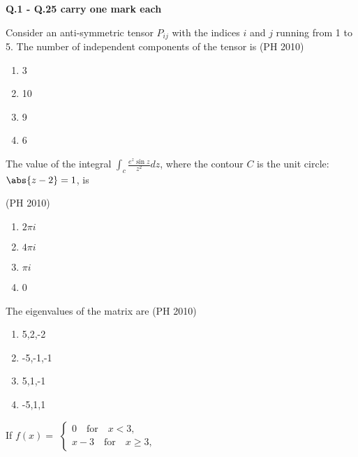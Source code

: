 \iffalse
\title{PH-2010-1-13}
\author{EE24BTECH11041-Mohit}
\section{PH}
\chapter{2010}
\fi


\textbf{Q.1 - Q.25 carry one mark each}

\item Consider an anti-symmetric tensor $P_{ij}$ with the indices $i$ and $j$ running from 1 to 5. The number of independent components of the tensor is 
\hfill{(PH 2010)}
\begin{multicols}{4}
\begin{enumerate}
\item 3
\item 10
\item 9 
\item 6
\end{enumerate}
\end{multicols}
\item The value of the integral $\int_{c} \frac {e^z \sin{z}}{z^2}dz$, where the contour $C$ is the unit circle:
$\abs{z-2}=1$, is

\hfill{(PH 2010)}
\begin{multicols}{4}
\begin{enumerate}
\item $2\pi i$
\item $4\pi i$
\item $\pi i$
\item 0
\end{enumerate}
\end{multicols}

\item The eigenvalues of the matrix 
are 
\hfill{(PH 2010)}
\begin{multicols}{4}
\begin{enumerate}
\item 5,2,-2
\item -5,-1,-1
\item 5,1,-1
\item -5,1,1
\end{enumerate}
\end{multicols}
\item If 
$f(x) =$ 
$\begin{cases} 
0 \quad \text{for} \quad x < 3, \\ 
x - 3 \quad \text{for} \quad x \geq 3, 
\end{cases}$

